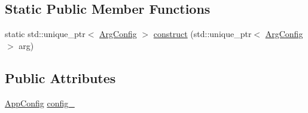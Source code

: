 \subsection*{Static Public Member Functions}
\begin{DoxyCompactItemize}
\item 
static std\+::unique\+\_\+ptr$<$ \hyperlink{structvt_1_1arguments_1_1_arg_config}{Arg\+Config} $>$ \hyperlink{structvt_1_1arguments_1_1_arg_config_a2248f3913b93ca336fdac5c2ec9c6e0b}{construct} (std\+::unique\+\_\+ptr$<$ \hyperlink{structvt_1_1arguments_1_1_arg_config}{Arg\+Config} $>$ arg)
\end{DoxyCompactItemize}
\subsection*{Public Attributes}
\begin{DoxyCompactItemize}
\item 
\hyperlink{structvt_1_1arguments_1_1_app_config}{App\+Config} \hyperlink{structvt_1_1arguments_1_1_arg_config_af30e0eae1ac1b29f7c85c25636109a9e}{config\+\_\+}
\end{DoxyCompactItemize}
